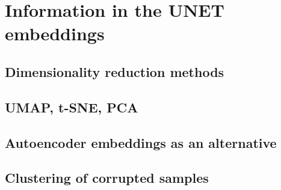 \section{Information in the UNET embeddings}
    \subsection{Dimensionality reduction methods}
    \subsection{UMAP, t-SNE, PCA}
    \subsection{Autoencoder embeddings as an alternative}
        
    \clearpage
    \subsection{Clustering of corrupted samples}